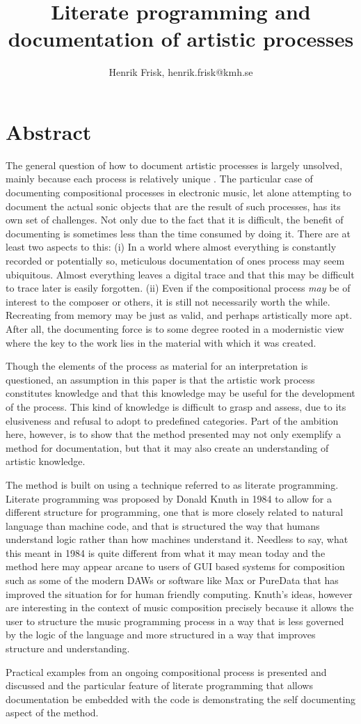 \documentclass[11pt]{article}
\author{Henrik Frisk, henrik.frisk@kmh.se}
\date{}
\title{Literate programming and documentation of artistic processes}
\begin{document}
\maketitle
\section*{Abstract}
\label{sec:orgbfb001d}
The general question of how to document artistic processes is largely
unsolved, mainly because each process is relatively unique
\citep[Seee][for a related discussion on documentation]{frisk2018:artdoc}. The particular case of documenting compositional processes in electronic music, let alone attempting to document the actual sonic objects that are the result of such processes, has its own set of challenges. Not only due to the fact that it is difficult, the benefit of documenting is sometimes less than the time consumed by doing it. There are at least two aspects to this: (i) In a world where almost everything is constantly recorded or potentially so, meticulous documentation of ones process may seem ubiquitous. Almost everything leaves a digital trace and that this may be difficult to trace later is easily forgotten. (ii) Even if the compositional process \emph{may} be of interest to the composer or others, it is still not necessarily worth the while. Recreating from memory may be just as valid, and perhaps artistically more apt. After all, the documenting force is to some degree rooted in a modernistic view where the key to the work lies in the material with which it was created.

Though the elements of the process as material for an interpretation is questioned, an assumption in this paper is that the artistic work process constitutes knowledge and that this knowledge may be useful for the development of the process. This kind of knowledge is difficult to grasp and assess, due to its elusiveness and refusal to adopt to predefined categories. Part of the ambition here, however, is to show that the method presented may not only exemplify a method for documentation, but that it may also create an understanding of artistic knowledge.

The method is built on using a technique referred to as literate programming. Literate programming was proposed by Donald Knuth in 1984 \citep{Knuth1984} to allow for a different structure for programming, one that is more closely related to natural language than machine code, and that is structured the way that humans understand logic rather than how machines understand it. Needless to say, what this meant in 1984 is quite different from what it may mean today and the method here may appear arcane to users of GUI based systems for composition such as some of the modern DAWs or software like Max or PureData that has improved the situation for for human friendly computing. Knuth's ideas, however are interesting in the context of music composition precisely because it allows the user to structure the music programming process in a way that is less governed by the logic of the language and more structured in a way that improves structure and understanding.

Practical examples from an ongoing compositional process is presented
and discussed and the particular feature of literate programming that
allows documentation be embedded with the code is demonstrating the
self documenting aspect of the method.

\printbibliography
\end{document}

